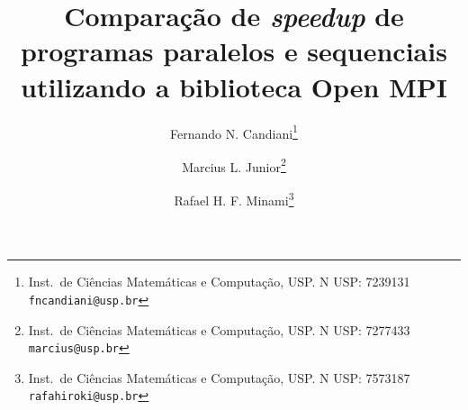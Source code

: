 \documentclass[11pt,twoside]{article}
\begin{document}
% 

%



\TRMakeCover


%
\pagestyle{myheadings}
\thispagestyle{empty}

%
\title{Comparação de \textit{speedup} de programas paralelos e sequenciais utilizando a biblioteca Open MPI}

\author{Fernando N. Candiani\thanks{Inst.~de Ciências Matemáticas e Computação, USP. N USP: 7239131 \texttt{fncandiani@usp.br}} \and
Marcius L. Junior\thanks{Inst.~de Ciências Matemáticas e Computação, USP. N USP: 7277433 \texttt{marcius@usp.br}} \and
Rafael H. F. Minami\thanks{Inst.~de Ciências Matemáticas e Computação, USP. N USP: 7573187 \texttt{rafahiroki@usp.br}}}

\date{}

\maketitle
\end{document}
